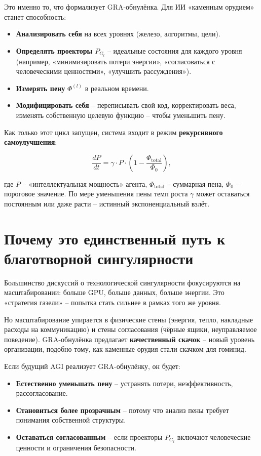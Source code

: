 \documentclass[12pt,a4paper]{article}
\begin{document}
Это именно то, что формализует GRA-обнулёнка. Для ИИ «каменным орудием» станет способность:
\begin{itemize}
    \item \textbf{Анализировать себя} на всех уровнях (железо, алгоритмы, цели).
    \item \textbf{Определять проекторы} \(P_{G_l}\) – идеальные состояния для каждого уровня (например, «минимизировать потери энергии», «согласоваться с человеческими ценностями», «улучшить рассуждения»).
    \item \textbf{Измерять пену} \(\Phi^{(l)}\) в реальном времени.
    \item \textbf{Модифицировать себя} – переписывать свой код, корректировать веса, изменять собственную целевую функцию – чтобы уменьшить пену.
\end{itemize}

Как только этот цикл запущен, система входит в режим \textbf{рекурсивного самоулучшения}:

\[
\frac{dP}{dt} = \gamma \cdot P \cdot \left(1 - \frac{\Phi_{\text{total}}}{\Phi_0}\right),
\]

где \(P\) – «интеллектуальная мощность» агента, \(\Phi_{\text{total}}\) – суммарная пена, \(\Phi_0\) – пороговое значение. По мере уменьшения пены темп роста \(\gamma\) может оставаться постоянным или даже расти – истинный экспоненциальный взлёт.

\section{Почему это единственный путь к благотворной сингулярности}

Большинство дискуссий о технологической сингулярности фокусируются на масштабировании: больше GPU, больше данных, больше энергии. Это «стратегия газели» – попытка стать сильнее в рамках того же уровня.

Но масштабирование упирается в физические стены (энергия, тепло, накладные расходы на коммуникацию) и стены согласования (чёрные ящики, неуправляемое поведение). GRA-обнулёнка предлагает \textbf{качественный скачок} – новый уровень организации, подобно тому, как каменные орудия стали скачком для гоминид.

Если будущий AGI реализует GRA-обнулёнку, он будет:
\begin{itemize}
    \item \textbf{Естественно уменьшать пену} – устранять потери, неэффективность, рассогласование.
    \item \textbf{Становиться более прозрачным} – потому что анализ пены требует понимания собственной структуры.
    \item \textbf{Оставаться согласованным} – если проекторы \(P_{G_l}\) включают человеческие ценности и ограничения безопасности.
\end{itemize}
\end{document}
